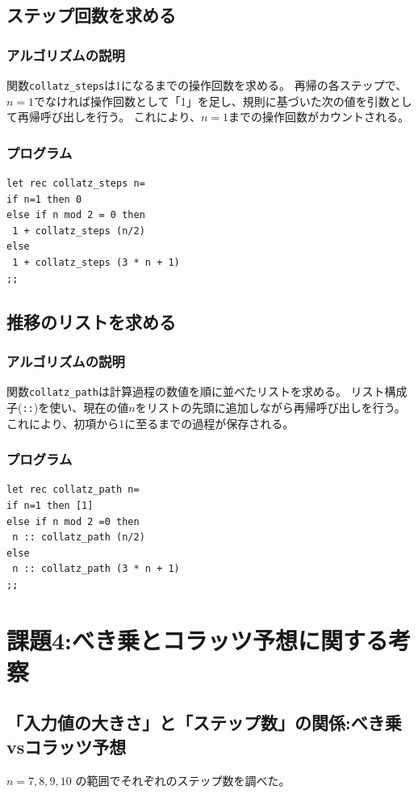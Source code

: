 \documentclass[titlepage]{ltjsarticle}
\begin{document}
\subsection{ステップ回数を求める}
\subsubsection{アルゴリズムの説明}
関数\texttt{collatz\_steps}は1になるまでの操作回数を求める。
再帰の各ステップで、$n=1$でなければ操作回数として「1」を足し、規則に基づいた次の値を引数として再帰呼び出しを行う。
これにより、$n=1$までの操作回数がカウントされる。

\subsubsection{プログラム}
\begin{verbatim}
let rec collatz_steps n=
if n=1 then 0
else if n mod 2 = 0 then
 1 + collatz_steps (n/2)
else
 1 + collatz_steps (3 * n + 1)
;;
\end{verbatim}

\subsection{推移のリストを求める}
\subsubsection{アルゴリズムの説明}
関数\texttt{collatz\_path}は計算過程の数値を順に並べたリストを求める。
リスト構成子(\texttt{::})を使い、現在の値$n$をリストの先頭に追加しながら再帰呼び出しを行う。
これにより、初項から1に至るまでの過程が保存される。

\subsubsection{プログラム}
\begin{verbatim}
let rec collatz_path n=
if n=1 then [1]
else if n mod 2 =0 then
 n :: collatz_path (n/2)
else
 n :: collatz_path (3 * n + 1)
;;
\end{verbatim}

\section{課題4:べき乗とコラッツ予想に関する考察}
\subsection{「入力値の大きさ」と「ステップ数」の関係:べき乗vsコラッツ予想}
$n=7, 8, 9, 10$ の範囲でそれぞれのステップ数を調べた。
\end{document}
